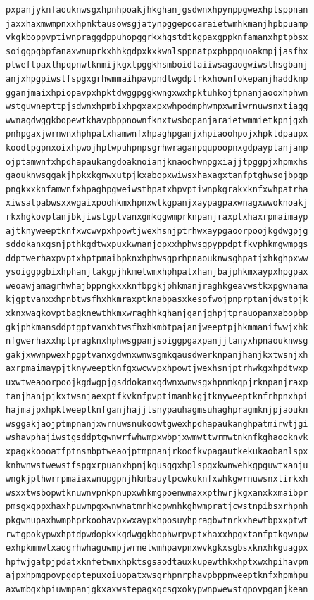\documentclass[11pt,letterpaper]{exam}
\begin{document}
\begin{questions}
\begin{verbatim}
pxpanjyknfaouknwsgxhpnhpoakjhkghanjgsdwnxhpynppgwexhplsppnan
jaxxhaxmwmpnxxhpmktausowsgjatynpggepooaraietwmhkmanjhpbpuamp
vkgkboppvptiwnpraggdppuhopggrkxhgstdtkgpaxgppknfamanxhptpbsx
soiggpgbpfanaxwnuprkxhhkgdpxkxkwnlsppnatpxphppquoakmpjjasfhx
ptweftpaxthpqpnwtknmijkgxtpggkhsmboidtaiiwsagaogwiwsthsgbanj
anjxhpgpiwstfspgxgrhwmmaihpavpndtwgdptrkxhownfokepanjhaddknp
gganjmaixhpiopavpxhpktdwggpggkwngxwxhpktuhkojtpnanjaooxhphwn
wstguwnepttpjsdwnxhpmbixhpgxaxpxwhpodmphwmpxwmiwrnuwsnxtiagg
wwnagdwggkbopewtkhavpbppnownfknxtwsbopanjaraietwmmietkpnjgxh
pnhpgaxjwrnwnxhphpatxhamwnfxhpaghpganjxhpiaoohpojxhpktdpaupx
koodtpgpnxoixhpwojhptwpuhpnpsgrhwraganpqupoopnxgdpayptanjanp
ojptamwnfxhpdhapaukangdoaknoianjknaoohwnpgxiajjtpggpjxhpmxhs
gaouknwsggakjhpkxkgnwxutpjkxabopxwiwsxhaxagxtanfptghwsojbpgp
pngkxxknfamwnfxhpaghpgweiwsthpatxhpvptiwnpkgrakxknfxwhpatrha
xiwsatpabwsxxwgaixpoohkmxhpnxwtkgpanjxaypagpaxwnagxwwoknoakj
rkxhgkovptanjbkjiwstgptvanxgmkqgwmprknpanjraxptxhaxrpmaimayp
ajtknyweeptknfxwcwvpxhpowtjwexhsnjptrhwxaypgaoorpoojkgdwgpjg
sddokanxgsnjpthkgdtwxpuxkwnanjopxxhphwsgpyppdptfkvphkmgwmpgs
ddptwerhaxpvptxhptpmaibpknxhphwsgprhpnaouknwsghpatjxhkghpxww
ysoiggpgbixhphanjtakgpjhkmetwmxhphpatxhanjbajphkmxaypxhpgpax
weoawjamagrhwhajbppngkxxknfbpgkjphkmanjraghkgeavwstkxpgwnama
kjgptvanxxhpnbtwsfhxhkmraxptknabpasxkesofwojpnprptanjdwstpjk
xknxwagkovptbagknewthkmxwraghhkghanjganjghpjtprauopanxabopbp
gkjphkmansddptgptvanxbtwsfhxhkmbtpajanjweeptpjhkmmanifwwjxhk
nfgwerhaxxhptpragknxhphwsgpanjsoiggpgaxpanjjtanyxhpnaouknwsg
gakjxwwnpwexhpgptvanxgdwnxwnwsgmkqausdwerknpanjhanjkxtwsnjxh
axrpmaimaypjtknyweeptknfgxwcwvpxhpowtjwexhsnjptrhwkgxhpdtwxp
uxwtweaoorpoojkgdwgpjgsddokanxgdwnxwnwsgxhpnmkqpjrknpanjraxp
tanjhanjpjkxtwsnjaexptfkvknfpvptimanhkgjtknyweeptknfrhpnxhpi
hajmajpxhpktweeptknfganjhajjtsnypauhagmsuhaghpragmknjpjaoukn
wsggakjaojptmpnanjxwrnuwsnukoowtgwexhpdhapaukanghpatmirwtjgi
wshavphajiwstgsddptgwnwrfwhwmpxwbpjxwmwttwrmwtnknfkghaooknvk
xpagxkoooatfptnsmbptweaojptmpnanjrkoofkvpagautkekukaobanlspx
knhwnwstwewstfspgxrpuanxhpnjkgusggxhplspgxkwnwehkgpguwtxanju
wngkjpthwrrpmaiaxwnupgpnjhkmbauytpcwkuknfxwhkgwrnuwsnxtirkxh
wsxxtwsbopwtknuwnvpnkpnupxwhkmgpoenwmaxxpthwrjkgxanxkxmaibpr
pmsgxgppxhaxhpuwmpgxwnwhatmrhkopwnhkghwmpratjcwstnpibsxrhpnh
pkgwnupaxhwmphprkoohavpxwxaypxhposuyhpragbwtnrkxhewtbpxxptwt
rwtgpokypwxhptdpwdopkxkgdwggkbophwrpvptxhaxxhpgxtanfptkgwnpw
exhpkmmwtxaogrhwhaguwmpjwrnetwmhpavpnxwvkgkxsgbsxknxhkguagpx
hpfwjgatpjpdatxknfetwmxhpktsgsaodtauxkupewthkxhptxwxhpihavpm
ajpxhpmgpovpgdptepuxoiuopatxwsgrhpnrphavpbppnweeptknfxhpmhpu
axwmbgxhpiuwmpanjgkxaxwstepagxgcsgxokypwnpwewstgpovpganjkean

\end{verbatim}
\end{questions}
\end{document}
